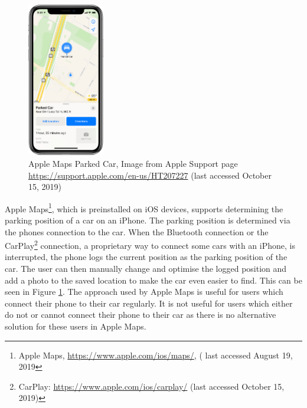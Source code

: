 \begin{figure}[h]
  \centering
  \includegraphics[width=0.3\textwidth]{images/ios13-iphone-xs-maps-parked-car.png}
  \caption{Apple Maps Parked Car, Image from Apple Support page \url{https://support.apple.com/en-us/HT207227} (last accessed October 15, 2019)}
  \label{fig:ios_park_det}
\end{figure}

Apple Maps\footnote{Apple Maps, \url{https://www.apple.com/ios/maps/}, ( last accessed  August 19, 2019}, which is preinstalled on iOS devices, supports determining the parking position of a car on an iPhone.  The parking position is determined via the phones connection to the car. When the Bluetooth connection or the CarPlay\footnote{CarPlay: \url{https://www.apple.com/ios/carplay/} (last accessed October 15, 2019)} connection, a proprietary way to connect some cars with an iPhone, is interrupted, the phone logs the current position as the parking position of the car. The user can then manually change and optimise the logged position and add a photo to the saved location to make the car even easier to find. This can be seen in Figure \ref{fig:ios_park_det}. The approach used by Apple Maps is useful for users which connect their phone to their car regularly. It is not useful for users which either do not or cannot connect their phone to their car as there is no alternative solution for these users in Apple Maps. \cite{apple:maps:parkedcar}

